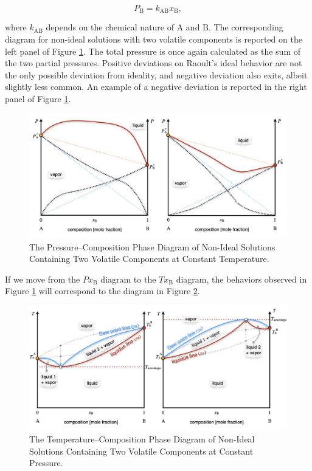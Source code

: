 \documentclass[
  9pt,
]{extbook}
\theoremstyle{definition}
\theoremstyle{definition}
\theoremstyle{definition}
\theoremstyle{remark}
\begin{document}
\begin{equation}
P_{\text{B}}=k_{\text{AB}} x_{\text{B}},
\label{eq:mc1b}
\end{equation}

where \(k_{\text{AB}}\) depends on the chemical nature of \(\mathrm{A}\) and \(\mathrm{B}\). The corresponding diagram for non-ideal solutions with two volatile components is reported on the left panel of Figure \ref{fig:FigMC7}. The total pressure is once again calculated as the sum of the two partial pressures. Positive deviations on Raoult's ideal behavior are not the only possible deviation from ideality, and negative deviation also exits, albeit slightly less common. An example of a negative deviation is reported in the right panel of Figure \ref{fig:FigMC7}.

\begin{figure}

{\centering \includegraphics[width=0.8\linewidth]{./img/OEP_Figures.025} 

}

\caption{The Pressure–Composition Phase Diagram of Non-Ideal Solutions Containing Two Volatile Components at Constant Temperature.}\label{fig:FigMC7}
\end{figure}

If we move from the \(Px_{\text{B}}\) diagram to the \(Tx_{\text{B}}\) diagram, the behaviors observed in Figure \ref{fig:FigMC7} will correspond to the diagram in Figure \ref{fig:FigMC8}.

\begin{figure}

{\centering \includegraphics[width=0.8\linewidth]{./img/OEP_Figures.026} 

}

\caption{The Temperature–Composition Phase Diagram of Non-Ideal Solutions Containing Two Volatile Components at Constant Pressure.}\label{fig:FigMC8}
\end{figure}
\end{document}
